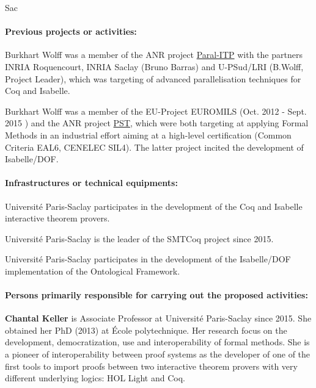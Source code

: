 \begin{sitedescription}{Sac}
\paragraph*{Previous projects or activities:}

\begin{compactitem}
\item Burkhart Wolff was a member of the ANR project
  \href{http://www.lri.fr/~wolff/projects/ANR-Paral-ITP/}{Paral-ITP}
  with the partners INRIA Roquencourt, INRIA Saclay (Bruno Barras) and
  U-PSud/LRI (B.Wolff, Project Leader), which was targeting of advanced
  parallelisation techniques for Coq and Isabelle.
\item Burkhart Wolff was a member of the EU-Project EUROMILS (Oct. 2012
  - Sept. 2015 ) and the ANR project
  \href{http://www.irt-systemx.fr/en/project/pst/}{PST}, which were both
  targeting at applying Formal Methods in an industrial effort aiming at
  a high-level certification (Common Criteria EAL6, CENELEC SIL4). The
  latter project incited the development of
  Isabelle/DOF\cite{brucker_achim_d_2019_3370483}.
\end{compactitem} 

\paragraph*{Infrastructures or technical equipments:}

\begin{compactitem}
\item Université Paris-Saclay participates in the development of the Coq
  and Isabelle interactive theorem provers.
\item Université Paris-Saclay is the leader of the SMTCoq project since
  2015.
\item Université Paris-Saclay participates in the development of the
  Isabelle/DOF implementation of the Ontological Framework.
\end{compactitem}

\paragraph*{Persons primarily responsible for carrying out the proposed
  activities:}

\begin{compactitem} %

\item {\bf Chantal Keller} is Associate Professor at Université
  Paris-Saclay since 2015. She obtained her PhD (2013) at École
  polytechnique. Her research focus on the development, democratization,
  use and interoperability of formal methods. She is a pioneer of
  interoperability between proof systems as the developer of one of the
  first tools to import proofs between two interactive theorem provers
  with very different underlying logics: HOL Light and Coq.


\end{compactitem}
\end{sitedescription}

